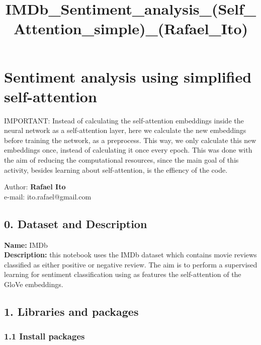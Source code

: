 \documentclass[10pt]{article}
\title{IMDb\_Sentiment\_analysis\_(Self\_Attention\_simple)\_(Rafael\_Ito)}
\begin{document}
    
    \maketitle
    
    

    
    \hypertarget{sentiment-analysis-using-simplified-self-attention}{%
\section{Sentiment analysis using simplified
self-attention}\label{sentiment-analysis-using-simplified-self-attention}}

    IMPORTANT: Instead of calculating the self-attention embeddings inside
the neural network as a self-attention layer, here we calculate the new
embeddings before training the network, as a preprocess. This way, we
only calculate this new embeddings once, instead of calculating it once
every epoch. This was done with the aim of reducing the computational
resources, since the main goal of this activity, besides learning about
self-attention, is the effiency of the code.

    Author: \textbf{Rafael Ito}\\
e-mail: ito.rafael@gmail.com

    \hypertarget{dataset-and-description}{%
\subsection{0. Dataset and Description}\label{dataset-and-description}}

\textbf{Name:} IMDb\\
\textbf{Description:} this notebook uses the IMDb dataset which contains
movie reviews classified as either positive or negative review. The aim
is to perform a supervised learning for sentiment classification using
as features the self-attention of the GloVe embeddings.

    \hypertarget{libraries-and-packages}{%
\subsection{1. Libraries and packages}\label{libraries-and-packages}}

    \hypertarget{install-packages}{%
\subsubsection{1.1 Install packages}\label{install-packages}}
\end{document}
